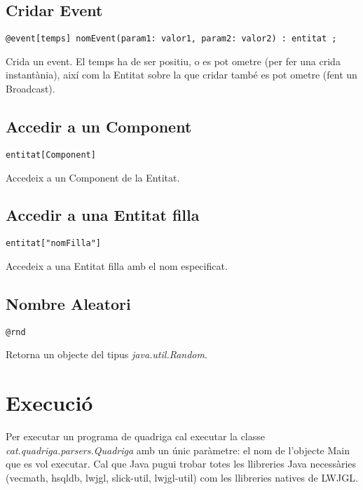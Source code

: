 \subsection{Cridar Event}

\begin{verbatim}
@event[temps] nomEvent(param1: valor1, param2: valor2) : entitat ;
\end{verbatim}

Crida un event. El temps ha de ser positiu, o es pot ometre (per fer una crida instantània), així com la Entitat sobre la que cridar també es pot ometre (fent un Broadcast).

\subsection{Accedir a un Component}

\begin{verbatim}
entitat[Component]
\end{verbatim}

Accedeix a un Component de la Entitat.

\subsection{Accedir a una Entitat filla}

\begin{verbatim}
entitat["nomFilla"]
\end{verbatim}

Accedeix a una Entitat filla amb el nom especificat.

\subsection{Nombre Aleatori}

\begin{verbatim}
@rnd
\end{verbatim}

Retorna un objecte del tipus {\em java.util.Random}.

\section{Execució}

Per executar un programa de quadriga cal executar la classe {\em cat.quadriga.parsers.Quadriga} amb un únic paràmetre: el nom de l'objecte Main que es vol executar. Cal que Java pugui trobar totes les llibreries Java necessàries (vecmath, hsqldb, lwjgl, slick-util, lwjgl-util) com les llibreries natives de LWJGL.